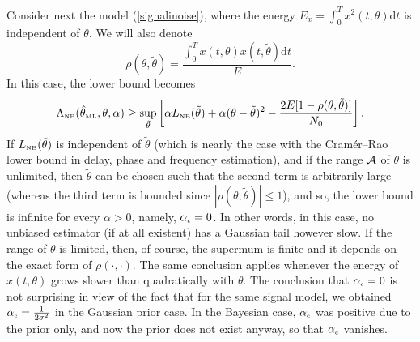 \documentclass[11pt,epsf]{article}
\newcommand{\ttt}{\tilde{\theta}}
\newcommand{\ct}{\hat{\theta}}
\newcommand{\calA}{{\cal A}}
\begin{document}
Consider next the model (\ref{signalinoise}), where the energy
$E_x=\int_0^Tx^2(t,\theta)\mbox{d}t$ is independent of $\theta$.
We will also denote
\begin{equation}
\rho(\theta,\ttt)=\frac{\int_0^Tx(t,\theta)x(t,\ttt)\mbox{d}t}{E}.
\end{equation}
In this case, the lower bound becomes
\begin{equation}
\Lambda_{\mbox{\tiny NB}}(\ct_{\mbox{\tiny ML}},\theta,\alpha)\ge
\sup_{\ttt}\left[\alpha L_{\mbox{\tiny
NB}}(\ttt)+\alpha(\theta-\ttt)^2-\frac{2E[1-\rho(\theta,\ttt)]}{N_0}\right].
\end{equation}
If $L_{\mbox{\tiny NB}}(\ttt)$ is independent of $\ttt$ (which is nearly
the case with the Cram\'er--Rao lower bound 
in delay, phase and frequency estimation), and if the range $\calA$ of $\theta$
is unlimited, then $\ttt$ can be chosen such that the second term is
arbitrarily large (whereas the third term is bounded since
$|\rho(\theta,\ttt)|\le 1$), and so, the lower bound is infinite for every
$\alpha > 0$, namely, $\alpha_{\mbox{\tiny c}}=0$. In other words, in this
case, no unbiased estimator (if at all existent) has a Gaussian tail however
slow. If the range of $\theta$ is
limited, then, of course, the supermum is finite and it depends on the
exact form of $\rho(\cdot,\cdot)$. The same conclusion applies whenever the energy
of $x(t,\theta)$ grows slower than quadratically with $\theta$.
The conclusion that $\alpha_{\mbox{\tiny c}}=0$ is not surprising in view of
the fact that for the same signal model, we obtained $\alpha_{\mbox{\tiny
c}}=\frac{1}{2\sigma^2}$ in the Gaussian prior case. In the Bayesian case,
$\alpha_{\mbox{\tiny c}}$ was positive due to the prior only, and now the
prior does not exist anyway, so that $\alpha_{\mbox{\tiny c}}$ vanishes.
\end{document}
